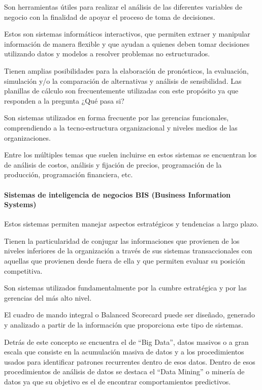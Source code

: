 \documentclass[a4paper, 12pt]{article}
\begin{document}
Son herramientas útiles para realizar el análisis de las diferentes variables de negocio con la finalidad de apoyar el proceso de toma de decisiones.

Estos son sistemas informáticos interactivos, que permiten extraer y manipular información de manera flexible y que ayudan a quienes deben tomar decisiones utilizando datos y modelos a resolver problemas no estructurados.

Tienen amplias posibilidades para la elaboración de pronósticos, la evaluación, simulación y/o la comparación de alternativas y análisis de sensibilidad. Las planillas de cálculo son frecuentemente utilizadas con este propósito ya que responden a la pregunta ¿Qué pasa si? 

Son sistemas utilizados en forma frecuente por las gerencias funcionales, comprendiendo a la tecno-estructura organizacional y niveles medios de las organizaciones.

Entre los múltiples temas que suelen incluirse en estos sistemas se encuentran los de análisis de costos, análisis y fijación de precios, programación de la producción, programación financiera, etc.

\paragraph{Sistemas de inteligencia de negocios BIS (Business Information Systems)}

Estos sistemas permiten manejar aspectos estratégicos y tendencias a largo plazo. 

Tienen la particularidad de conjugar las informaciones que provienen de los niveles inferiores de la organización a través de sus sistemas transaccionales con aquellas que provienen desde fuera de ella y que permiten evaluar su posición competitiva. 

Son sistemas utilizados fundamentalmente por la cumbre estratégica y por las gerencias del más alto nivel.

El cuadro de mando integral o Balanced Scorecard puede ser diseñado, generado y analizado a partir de la información que proporciona este tipo de sistemas.

Detrás de este concepto se encuentra el de “Big Data”, datos masivos o a gran escala que consiste en la acumulación masiva de datos y a los procedimientos usados para identificar patrones recurrentes dentro de esos datos. Dentro de esos procedimientos de análisis de datos se destaca el “Data Mining” o minería de datos ya que su objetivo es el de encontrar comportamientos predictivos.
\end{document}
